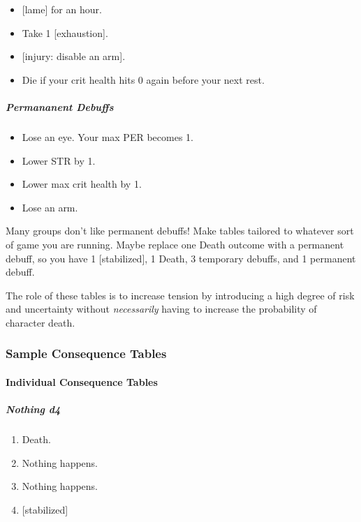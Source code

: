 \documentclass[
  letterpaper,
  DIV=11,
  numbers=noendperiod]{scrartcl}
\let\oldparagraph\paragraph
\renewcommand{\paragraph}[1]{\oldparagraph{#1}\mbox{}}
\let\oldsubparagraph\subparagraph
\renewcommand{\subparagraph}[1]{\oldsubparagraph{#1}\mbox{}}
\providecommand{\tightlist}{%
  \setlength{\itemsep}{0pt}\setlength{\parskip}{0pt}}\usepackage{longtable,booktabs,array}
\begin{document}
\begin{itemize}
\tightlist
\item
  {[}lame{]} for an hour.
\item
  Take 1 {[}exhaustion{]}.
\item
  {[}injury: disable an arm{]}.
\item
  Die if your crit health hits 0 again before your next rest.
\end{itemize}

\subparagraph{Permananent Debuffs}\label{permananent-debuffs}

\begin{itemize}
\tightlist
\item
  Lose an eye. Your max PER becomes 1.
\item
  Lower STR by 1.
\item
  Lower max crit health by 1.
\item
  Lose an arm.
\end{itemize}

Many groups don't like permanent debuffs! Make tables tailored to
whatever sort of game you are running. Maybe replace one Death outcome
with a permanent debuff, so you have 1 {[}stabilized{]}, 1 Death, 3
temporary debuffs, and 1 permanent debuff.

The role of these tables is to increase tension by introducing a high
degree of risk and uncertainty without \emph{necessarily} having to
increase the probability of character death.

\subsubsection{Sample Consequence
Tables}\label{sample-consequence-tables}

\paragraph{Individual Consequence
Tables}\label{individual-consequence-tables}

\subparagraph{Nothing d4}\label{nothing-d4}

\begin{enumerate}
\def\labelenumi{\arabic{enumi}.}
\tightlist
\item
  Death.
\item
  Nothing happens.
\item
  Nothing happens.
\item
  {[}stabilized{]}
\end{enumerate}
\end{document}
